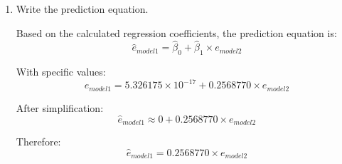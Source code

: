 \documentclass[12pt,letterpaper]{article}
\begin{document}
\begin{enumerate}
		\item Write the prediction equation.
		
		Based on the calculated regression coefficients, the prediction equation is:
		$$
		\hat{e}_{model1} = \hat{\beta}_0 + \hat{\beta}_1 \times e_{model2}
		$$
		
		With specific values:
		$$
		\hat{e}_{model1} = 5.326175 \times 10^{-17} + 0.2568770 \times e_{model2}
		$$
		
		After simplification:
		$$
		\hat{e}_{model1} \approx 0 + 0.2568770 \times e_{model2}
		$$
		
		Therefore:
		$$
		\hat{e}_{model1} = 0.2568770 \times e_{model2}
		$$
		
	\end{enumerate}
	
	\newpage	
\end{document}
